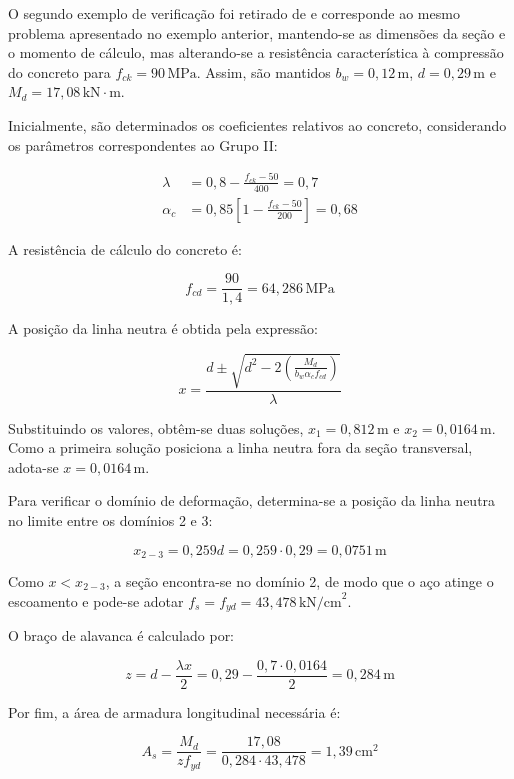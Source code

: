 O segundo exemplo de verificação foi retirado de  e corresponde ao mesmo problema apresentado no exemplo anterior, mantendo-se as dimensões da seção e o momento de cálculo, mas alterando-se a resistência característica à compressão do concreto para $f_{ck}=90\,\text{MPa}$. Assim, são mantidos $b_w=0,12\,\text{m}$, $d=0,29\,\text{m}$ e $M_d=17,08\,\text{kN}\cdot\text{m}$.

Inicialmente, são determinados os coeficientes relativos ao concreto, considerando os parâmetros correspondentes ao Grupo II:

\begin{align}
\lambda &= 0,8-\frac{f_{ck}-50}{400}=0,7 \\
\alpha_c &= 0,85\left[1-\frac{f_{ck}-50}{200}\right]=0,68
\end{align}

A resistência de cálculo do concreto é:

\begin{equation}
f_{cd}=\frac{90}{1,4}=64,286\,\text{MPa}
\end{equation}

A posição da linha neutra é obtida pela expressão:

\begin{equation}
x=\frac{d\pm\sqrt{d^2-
2\left(\frac{M_d}{b_w\alpha_cf_{cd}}\right)}}{\lambda}
\end{equation}

Substituindo os valores, obtêm-se duas soluções, $x_1=0,812\,\text{m}$ e $x_2=0,0164\,\text{m}$. Como a primeira solução posiciona a linha neutra fora da seção transversal, adota-se $x=0,0164\,\text{m}$.

Para verificar o domínio de deformação, determina-se a posição da linha neutra no limite entre os domínios 2 e 3:

\begin{equation}
x_{2-3}=0,259d=0,259\cdot0,29
=0,0751\,\text{m}
\end{equation}

Como $x<x_{2-3}$, a seção encontra-se no domínio 2, de modo que o aço atinge o escoamento e pode-se adotar $f_s=f_{yd}=43,478\,\text{kN/cm}^2$.

O braço de alavanca é calculado por:

\begin{equation}
z=d-\frac{\lambda x}{2}
=0,29-\frac{0,7\cdot0,0164}{2}
=0,284\,\text{m}
\end{equation}

Por fim, a área de armadura longitudinal necessária é:

\begin{equation}
A_s=\frac{M_d}{z f_{yd}}
=\frac{17,08}{0,284\cdot43,478}
=1,39\,\text{cm}^2
\end{equation}




